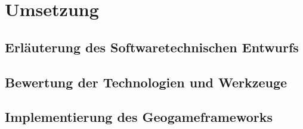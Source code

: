 \chapter{Umsetzung}
\label{ch:S5_Umsetzung}

\section{Erläuterung des Softwaretechnischen Entwurfs}

\section{Bewertung der Technologien und Werkzeuge}

\section{Implementierung des Geogameframeworks}